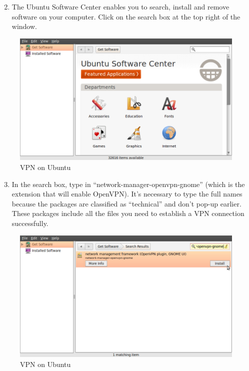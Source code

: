 \begin{enumerate}[1.]
\setcounter{enumi}{1}
\item
  The Ubuntu Software Center enables you to search, install and remove
  software on your computer. Click on the search box at the top right of
  the window.
\end{enumerate}
\begin{figure}[htbp]
\centering
\includegraphics{vpn_ubuntu_002.png}
\caption{VPN on Ubuntu}
\end{figure}

\begin{enumerate}[1.]
\setcounter{enumi}{2}
\item
  In the search box, type in ``network-manager-openvpn-gnome'' (which is
  the extension that will enable OpenVPN). It's necessary to type the
  full names because the packages are classified as ``technical'' and
  don't pop-up earlier. These packages include all the files you need to
  establish a VPN connection successfully.
\end{enumerate}
\begin{figure}[htbp]
\centering
\includegraphics{vpn_ubuntu_003.png}
\caption{VPN on Ubuntu}
\end{figure}

